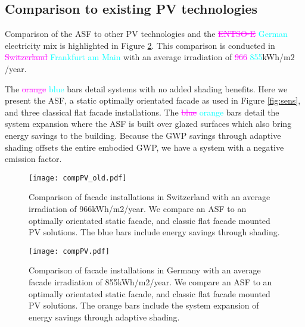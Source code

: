\subsection{Comparison to existing PV technologies}

Comparison of the ASF to other PV technologies and the \textcolor{magenta}{\sout{ENTSO-E}} \textcolor{cyan}{German} electricity mix is highlighted in Figure \ref{fig:compPV}. This comparison is conducted in \textcolor{magenta}{\sout{Switzerland}} \textcolor{cyan}{Frankfurt am Main} with an average irradiation of \textcolor{magenta}{\sout{966}} \textcolor{cyan}{855}kWh/m$2$/year.\

The \textcolor{magenta}{\sout{orange}} \textcolor{cyan}{blue} bars detail systems with no added shading benefits. Here we present the ASF, a static optimally orientated facade as used in Figure \ref{fig:sens}, and three classical flat facade installations.  
The \textcolor{magenta}{\sout{blue}} \textcolor{cyan}{orange} bars detail the system expansion where the ASF is built over glazed surfaces which also bring energy savings to the building. Because the GWP savings through adaptive shading offsets the entire embodied GWP, we have a system with a negative emission factor.




\begin{figure}[H]
\begin{center}
\begin{mdframed}[linecolor=magenta, linewidth=2pt]
\texttt{[image: compPV\_old.pdf]}
\caption{Comparison of facade installations in Switzerland with an average irradiation of 966kWh/m2/year.
We compare an ASF to an optimally orientated static facade, and classic flat facade mounted PV solutions. The blue bars include energy savings through shading.}
\label{fig:compPV_old}
\end{mdframed}
\end{center}
\end{figure}

\begin{figure}[H]
\begin{center}
\begin{mdframed}[linecolor=cyan, linewidth=2pt]
\texttt{[image: compPV.pdf]}
\caption{Comparison of facade installations in Germany with an average facade irradiation of 855kWh/m2/year.
We compare an ASF to an optimally orientated static facade, and classic flat facade mounted PV solutions. The orange bars include the system expansion of energy savings through adaptive shading.}
\label{fig:compPV}
\end{mdframed}
\end{center}
\end{figure}

